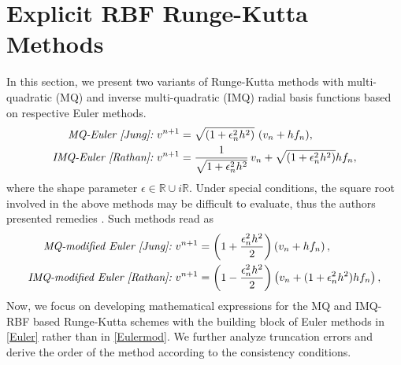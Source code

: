 \documentclass[a4paper, preprint,11pt]{elsarticle}
\numberwithin{equation}{section}
\begin{document}
\section{Explicit  RBF Runge-Kutta Methods}
In this section, we present two variants of Runge-Kutta methods with multi-quadratic (MQ) and inverse multi-quadratic (IMQ) radial basis functions based on respective Euler methods.
\begin{eqnarray}\label{Euler}
\begin{aligned}
\textit{MQ-Euler \cite{Jung}:}\,\, v^{n+1} &= \sqrt{(1 + \epsilon_n^2h^2)}\,\,(v_n + hf_n),\\
\textit{IMQ-Euler \cite{Rathan}:}\,\, v^{n+1} &=  \frac{1} {\sqrt{1 + \epsilon_n^2 h^2}}\,v_n+\sqrt{(1 + \epsilon_n^2h^2)} h f_n,
\end{aligned}    
\end{eqnarray}
where the shape parameter $\epsilon \in \mathbb{R} \cup i\mathbb{R}$. Under special conditions, the square root involved in the above methods may be difficult to evaluate, thus the authors presented remedies \cite{Jung,Rathan}. Such methods read as
\begin{eqnarray}\label{Eulermod}
\begin{aligned}
\textit{MQ-modified Euler \cite{Jung}:}\,\, v^{n+1} &= \left(1 + \dfrac{\epsilon_n^2h^2}{2}\right)\left(v_n + hf_n\right),\\
\textit{IMQ-modified Euler \cite{Rathan}:}\,\, v^{n+1} &= \left(1 - \dfrac{\epsilon_n^2h^2}{2}\right)\left(v_n +(1+\epsilon_n^2h^2) hf_n\right),
\end{aligned}    
\end{eqnarray}
Now, we focus on developing mathematical expressions for the MQ and IMQ-RBF based Runge-Kutta schemes with the building block of Euler methods in \eqref{Euler} rather than in \eqref{Eulermod}. We further analyze truncation errors and derive the order of the method according to the consistency conditions.
\end{document}

